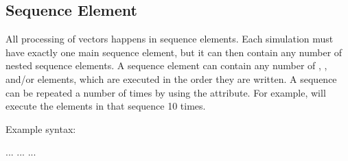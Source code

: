 \documentclass[letterpaper,10pt,english]{sphinxmanual}
\begin{document}
\subsection{Sequence Element}
\label{\detokenize{reference_elements:sequence-element}}\label{\detokenize{reference_elements:sequenceelement}}\label{\detokenize{reference_elements:index-64}}
\sphinxAtStartPar
All processing of vectors happens in sequence elements.  Each simulation must have exactly one main sequence element, but it can then contain any number of nested sequence elements.  A sequence element can contain any number of , {\hyperref[\detokenize{reference_elements:filterelement}]{}}, {\hyperref[\detokenize{reference_elements:integrateelement}]{}} and/or {\hyperref[\detokenize{reference_elements:breakpointelement}]{}} elements, which are executed in the order they are written.  A sequence can be repeated a number of times by using the  attribute.  For example,  will execute the elements in that sequence 10 times.

\sphinxAtStartPar
Example syntax:

\begin{sphinxVerbatim}[commandchars=\\\{\}]
 
     
          ... 
         ... 
         ...
\end{sphinxVerbatim}

\ignorespaces 
\end{document}
